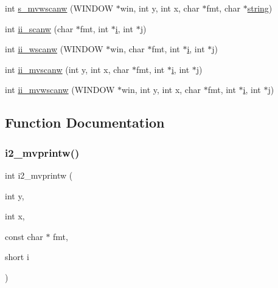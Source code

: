 \begin{DoxyCompactItemize}
\item 
int \hyperlink{C-macros_8c_ad40ae826be88925237db3a46518ca603}{s\+\_\+mvwscanw} (W\+I\+N\+D\+OW $\ast$win, int y, int x, char $\ast$fmt, char $\ast$\hyperlink{what__overview_81_8txt_a74cb7e955273b9f9157b4f0c18a38849}{string})
\item 
int \hyperlink{C-macros_8c_a13c589c66da48838bef7ced902997126}{ii\+\_\+scanw} (char $\ast$fmt, int $\ast$\hyperlink{intro__blas1_83_8txt_a8ba82a50c0c2c12d5f6a77f7e4651c0b}{i}, int $\ast$\hyperlink{exit_87_8txt_a8921ef29c441e427867c54bd3b2462ba}{j})
\item 
int \hyperlink{C-macros_8c_a4cca36c361fd3bcc48fdb5d0b723d765}{ii\+\_\+wscanw} (W\+I\+N\+D\+OW $\ast$win, char $\ast$fmt, int $\ast$\hyperlink{intro__blas1_83_8txt_a8ba82a50c0c2c12d5f6a77f7e4651c0b}{i}, int $\ast$\hyperlink{exit_87_8txt_a8921ef29c441e427867c54bd3b2462ba}{j})
\item 
int \hyperlink{C-macros_8c_a620ec84aba8d1a5fadbba5724f1e01b8}{ii\+\_\+mvscanw} (int y, int x, char $\ast$fmt, int $\ast$\hyperlink{intro__blas1_83_8txt_a8ba82a50c0c2c12d5f6a77f7e4651c0b}{i}, int $\ast$\hyperlink{exit_87_8txt_a8921ef29c441e427867c54bd3b2462ba}{j})
\item 
int \hyperlink{C-macros_8c_a5116eef3b9a53d8f12436984bfec0717}{ii\+\_\+mvwscanw} (W\+I\+N\+D\+OW $\ast$win, int y, int x, char $\ast$fmt, int $\ast$\hyperlink{intro__blas1_83_8txt_a8ba82a50c0c2c12d5f6a77f7e4651c0b}{i}, int $\ast$\hyperlink{exit_87_8txt_a8921ef29c441e427867c54bd3b2462ba}{j})
\end{DoxyCompactItemize}


\subsection{Function Documentation}
\mbox{\label{C-macros_8c_a32e22b11dad68fa76c882dc89f0997f1}} 
\subsubsection{\texorpdfstring{i2\+\_\+mvprintw()}{i2\_mvprintw()}}
{\footnotesize\ttfamily int i2\+\_\+mvprintw (\begin{DoxyParamCaption}\item[{int}]{y,  }\item[{int}]{x,  }\item[{const char $\ast$}]{fmt,  }\item[{short}]{i }\end{DoxyParamCaption})}

